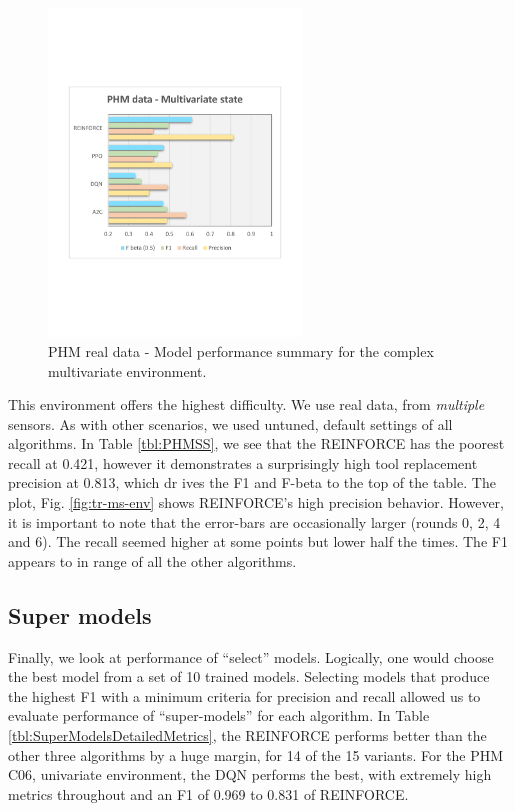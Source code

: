 \documentclass[a4paper, 12pt]{article}
\begin{document}
\begin{figure}[h]
	\centering
	\includegraphics[width=0.6\textwidth, trim={1.5cm 7cm 1cm 7cm}]{images/PHMMSPlot.pdf}  
	\caption{PHM real data - Model performance summary for the complex multivariate environment.}
	\label{fig:PHMMS}
\end{figure}
This environment offers the highest difficulty. We use real data, from \textit{multiple} sensors. As with other scenarios, we used untuned, default settings of all algorithms. In Table \ref{tbl:PHMSS}, we see that the REINFORCE has the poorest recall at 0.421, however it demonstrates a surprisingly high tool replacement precision at 0.813, which dr ives the F1 and F-beta to the top of the table. The plot, Fig. \ref{fig:tr-ms-env} shows REINFORCE's high precision behavior. However, it is important to note that the error-bars are occasionally larger (rounds 0, 2, 4 and 6). The recall seemed higher at some points but lower half the times. The F1 appears to in range of all the other algorithms.

\subsection{Super models}
Finally, we look at performance of ``select'' models. Logically, one would choose the best model from a set of 10 trained models. Selecting models that produce the highest F1 with a minimum criteria for precision and recall allowed us to evaluate performance of ``super-models'' for each algorithm. In Table \ref{tbl:SuperModelsDetailedMetrics}, the REINFORCE performs better than the other three algorithms by a huge margin, for 14 of the 15 variants. For the PHM C06, univariate environment, the DQN performs the best, with extremely high metrics throughout and an F1 of 0.969 to 0.831 of REINFORCE.
\end{document}

